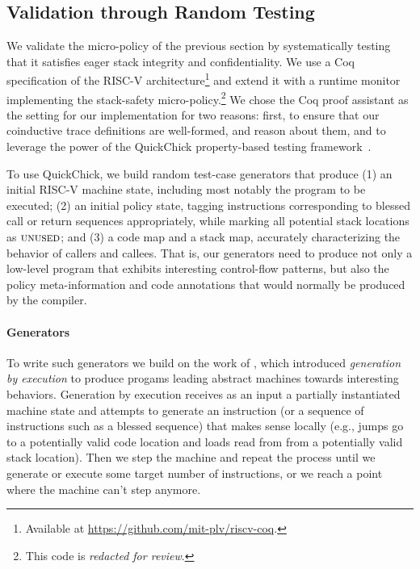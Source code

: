 \documentclass[acmsmall,review,anonymous]{acmart}\settopmatter{printfolios=true,printccs=false,printacmref=false}
\begin{document}
{%

\subsection{Validation through Random Testing}
\label{sec:testing}

We validate the micro-policy of the previous section by
systematically testing that it satisfies eager stack integrity and
confidentiality. We use a Coq specification of the RISC-V
architecture\footnote{Available at \url{https://github.com/mit-plv/riscv-coq}.}
and extend it with a
runtime monitor implementing the stack-safety
micro-policy.\footnote{This code is {\em redacted for review}.} We
  chose the Coq proof assistant as the setting for our implementation
  for two reasons: first, to ensure that our coinductive trace
  definitions are well-formed, and reason about them, and to leverage the power of the
  QuickChick property-based testing framework~\citep{Pierce:SF4}.

To use QuickChick, we build random test-case generators that produce
(1) an initial RISC-V machine state, including most notably
  the program to be executed;
(2)
  an initial policy state, tagging instructions corresponding to
  blessed call or return sequences appropriately, while marking
  all potential stack locations as $\textsc{unused}$; and
(3)
 a code map and a stack map, accurately characterizing the behavior
  of callers and callees.
%
That is, our generators need to produce not only a low-level program
that exhibits interesting control-flow patterns, but also the policy
meta-information and code annotations that would normally be produced
by the compiler.

\paragraph*{Generators}

To write such generators we build on the work of
\citep{TestingNI:ICFP, DBLP:journals/jfp/HritcuLSADHPV16}, which
introduced {\em generation by execution} to produce progams leading
abstract machines towards interesting behaviors. Generation by
execution receives as an input a partially instantiated machine state
and attempts to generate an instruction (or a sequence of instructions
such as a blessed sequence) that makes sense locally (e.g., jumps go
to a potentially valid code location and loads read from from a
potentially valid stack location). Then we step the machine and repeat
the process until we generate or execute some target number of
instructions, or we reach a point where the machine can't step
anymore.

}
\end{document}
